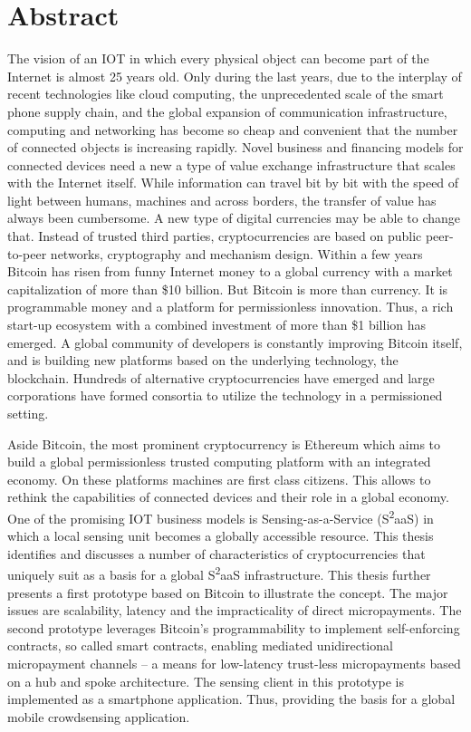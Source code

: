 \begingroup
\let\clearpage\relax
\let\cleardoublepage\relax
\let\cleardoublepage\relax

\chapter*{Abstract}

The vision of an \ac{IOT} in which every physical object can become part of the Internet is almost 25 years old. Only during the last years, due to the interplay of recent technologies like cloud computing, the unprecedented scale of the smart phone supply chain, and the global expansion of communication infrastructure, computing and networking has become so cheap and convenient that the number of connected objects is increasing rapidly. Novel business and financing models for connected devices need a new a type of value exchange infrastructure that scales with the Internet itself. While information can travel bit by bit with the speed of light between humans, machines and across borders, the transfer of value has always been cumbersome. A new type of digital currencies may be able to change that. Instead of trusted third parties, cryptocurrencies are based on public peer-to-peer networks, cryptography and mechanism design. Within a few years Bitcoin has risen from funny Internet money to a global currency with a market capitalization of more than \$10 billion. But Bitcoin is more than currency. It is programmable money and a platform for permissionless innovation. Thus, a rich start-up ecosystem with a combined investment of more than \$1 billion has emerged. A global community of developers is constantly improving Bitcoin itself, and is building new platforms based on the underlying technology, the blockchain. Hundreds of alternative cryptocurrencies have emerged and large corporations have formed consortia to utilize the technology in a permissioned setting.

Aside Bitcoin, the most prominent cryptocurrency is Ethereum which aims to build a global permissionless trusted computing platform with an integrated economy. On these platforms machines are first class citizens. This allows to rethink the capabilities of connected devices and their role in a global economy.
One of the promising \ac{IOT} business models is Sensing-as-a-Service (S\textsuperscript{2}aaS) in which a local sensing unit becomes a globally accessible resource.  This thesis identifies and discusses a number of characteristics of cryptocurrencies that uniquely suit as a basis for a global S\textsuperscript{2}aaS infrastructure. This thesis further presents a first prototype based on Bitcoin to illustrate the concept. The major issues are scalability, latency and the impracticality of direct micropayments. The second prototype leverages Bitcoin’s programmability to implement self-enforcing contracts, so called smart contracts, enabling mediated unidirectional micropayment channels -- a means for low-latency trust-less micropayments based on a hub and spoke architecture. The sensing client in this prototype is implemented as a smartphone application. Thus, providing the basis for a global mobile crowdsensing application.

